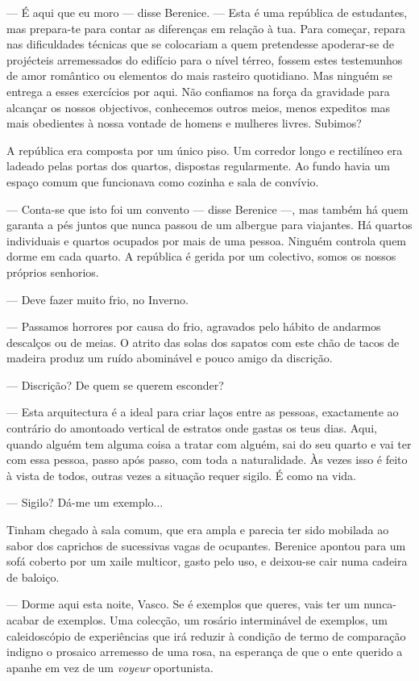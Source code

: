 --- É aqui que eu moro --- disse Berenice. --- Esta é uma república de
  estudantes, mas prepara-te para contar as diferenças em relação à
  tua. Para começar, repara nas dificuldades
técnicas que se colocariam a quem pretendesse apoderar-se de projécteis
arremessados do edifício para o nível térreo, fossem estes testemunhos
de amor romântico ou elementos do mais rasteiro quotidiano. Mas ninguém
se entrega a esses exercícios por aqui. Não confiamos na força da
gravidade para alcançar os nossos objectivos, conhecemos outros meios,
menos expeditos mas mais obedientes à nossa vontade de homens e mulheres livres. Subimos?

A república era composta por um único piso. Um corredor longo e
rectilíneo era ladeado pelas portas dos quartos, dispostas regularmente.
Ao fundo havia um espaço comum que funcionava como cozinha e sala de
convívio.

--- Conta-se que isto foi um convento --- disse Berenice
---, mas também há quem garanta a pés juntos que nunca passou de um
albergue para viajantes. Há quartos individuais e quartos ocupados por
mais de uma pessoa. Ninguém controla quem dorme em cada quarto. A
república é gerida por um colectivo, somos os nossos próprios senhorios.

--- Deve fazer muito frio, no Inverno.

--- Passamos horrores por causa do frio, agravados pelo hábito de andarmos
  descalços ou de meias. O atrito das solas dos sapatos com este chão de
  tacos de madeira produz um ruído abominável e pouco amigo da
  discrição.

--- Discrição? De quem se querem esconder?

--- Esta arquitectura é a ideal para criar laços entre as pessoas,
  exactamente ao contrário do amontoado vertical de estratos onde gastas
  os teus dias. Aqui, quando alguém tem alguma coisa a tratar com
  alguém, sai do seu quarto e vai ter com essa pessoa, passo após passo,
  com toda a naturalidade. Às vezes isso é feito à vista de todos,
  outras vezes a situação requer sigilo. É como na vida.

--- Sigilo? Dá-me um exemplo...

Tinham chegado à sala comum, que era ampla e parecia ter sido mobilada
ao sabor dos caprichos de sucessivas vagas de ocupantes. Berenice
apontou para um sofá coberto por um xaile multicor, gasto pelo uso, e
deixou-se cair numa cadeira de baloiço.

--- Dorme aqui esta noite, Vasco. Se é exemplos que queres, vais ter um
  nunca-acabar de exemplos. Uma colecção, um rosário interminável de
  exemplos, um caleidoscópio de experiências que irá reduzir à
  condição de termo de comparação indigno o prosaico arremesso de uma
  rosa, na esperança de que o ente querido a apanhe em vez de um
  \emph{voyeur }oportunista.

